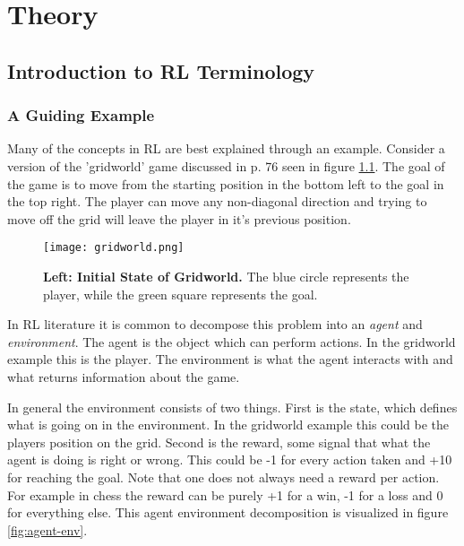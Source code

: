
\chapter{Theory}\label{ch:theo}

\section{Introduction to RL Terminology}

\subsection{A Guiding Example}

Many of the concepts in RL are best explained through an example. Consider a version of the 'gridworld' game discussed in p. 76 \cite{barto_sutton_1983} seen in figure \ref{fig:gridworld}. The goal of the game is to move from the starting position in the bottom left to the goal in the top right. The player can move any non-diagonal direction and trying to move off the grid will leave the player in it's previous position.

\begin{figure}[H]
    \centering
    \texttt{[image: gridworld.png]}
    \captionsetup{width=.5\textwidth}
    \caption{\textbf{Left: Initial State of Gridworld.} The blue circle represents the player, while the green square represents the goal.}
    \label{fig:gridworld}
\end{figure}

In RL literature it is common to decompose this problem into an \textit{agent} and \textit{environment}. The agent is the object which can perform actions. In the gridworld example this is the player. The environment is what the agent interacts with and what returns information about the game. 

In general the environment consists of two things. First is the state, which defines what is going on in the environment. In the gridworld example this could be the players position on the grid. Second is the reward, some signal that what the agent is doing is right or wrong. This could be -1 for every action taken and +10 for reaching the goal. Note that one does not always need a reward per action. For example in chess the reward can be purely +1 for a win, -1 for a loss and 0 for everything else. This agent environment decomposition is visualized in figure \ref{fig:agent-env}.

